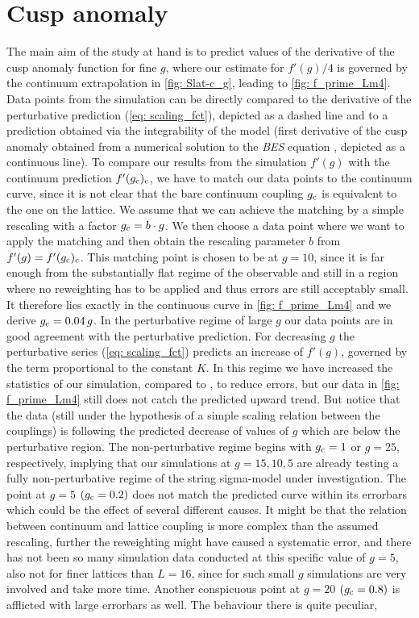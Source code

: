 \section{Cusp anomaly}\label{sec: res_cusp}
The main aim of the study at hand is to predict values  of the derivative of the cusp anomaly function for fine $g$, where our estimate for $f'(g)/4$ is governed by the continuum extrapolation in \autoref{fig: Slat-c_g}, leading to \autoref{fig: f_prime_Lm4}. Data points from the simulation can be directly compared to the derivative of the perturbative prediction (\ref{eq: scaling_fct}), depicted as a dashed line and to a prediction obtained via the integrability of the model (first derivative of the cusp anomaly obtained from a numerical solution to the \textit{BES} equation \cite{Beisert:2006ez}, depicted as a continuous line). To compare our results from the simulation $f'(g)$ with the continuum prediction $f'(g_{\rm c})_{\rm c}$, we have to match our data points to the continuum curve, since it is not clear that the bare continuum coupling $g_{\rm c}$ is equivalent to the one on the lattice. We assume that we can achieve the matching by a simple rescaling with a factor $g_{\rm c}= b\cdot g$. We then choose a data point where we want to apply the matching and then obtain the rescaling parameter $b$ from $f'(g)=f'(g_{\rm c})_{\rm c}$. This matching point is chosen to be at $g=10$, since it is far enough from the substantially flat regime of the observable and still in a region where no reweighting has to be applied and thus errors are still acceptably small. It therefore lies exactly in the continuous curve in \autoref{fig: f_prime_Lm4} and we derive $g_{\rm c}=0.04 \,g$. In the perturbative regime of large $g$ our data points are in good agreement with the perturbative prediction. For decreasing $g$ the perturbative series (\ref{eq: scaling_fct}) predicts an increase of $f'(g)$, governed by the term proportional to the  constant $K$. In this regime we have increased the statistics of our simulation, compared to \cite{Bianchi:2016cyv}, to reduce errors, but our data in \autoref{fig: f_prime_Lm4} still does not catch the predicted upward trend. But notice that the data (still under the hypothesis of a simple scaling relation between the couplings) is following the predicted decrease of values of $g$ which are below the perturbative region. The non-perturbative regime begins with $g_{\rm c}=1$ or $g=25$, respectively, implying that our simulations at $g=15,10,5$ are already testing a fully non-perturbative regime of the string sigma-model under investigation. The point at $g=5$ $(g_{\rm c}=0.2)$ does not match the predicted curve within its errorbars which could be the effect of several different causes. It might be that the relation between continuum and lattice coupling is more complex than the assumed rescaling, further the reweighting might have caused a systematic error, and there has not been so many simulation data conducted at this specific value of $g=5$, also not for finer lattices than $L=16$, since for such small $g$ simulations are very involved and take more time. Another conspicuous point at $g=20$ $(g_{\rm c}=0.8)$ is afflicted with large errorbars as well. The behaviour there is quite peculiar, 